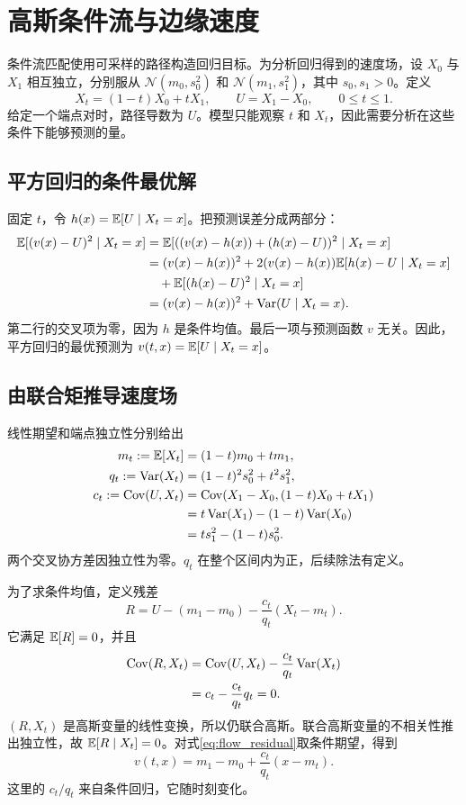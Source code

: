 \section{高斯条件流与边缘速度}\label{sec:flow}
条件流匹配使用可采样的路径构造回归目标。为分析回归得到的速度场，设 $X_0$ 与 $X_1$ 相互独立，分别服从 $\mathcal N(m_0,s_0^2)$ 和 $\mathcal N(m_1,s_1^2)$，其中 $s_0,s_1>0$。定义
\begin{equation}\label{eq:flow_path}
 X_t=(1-t)X_0+tX_1,\qquad U=X_1-X_0,\qquad 0\leq t\leq1.
\end{equation}
给定一个端点对时，路径导数为 $U$。模型只能观察 $t$ 和 $X_t$，因此需要分析在这些条件下能够预测的量。

\subsection{平方回归的条件最优解}
固定 $t$，令 $h(x)=\mathbb E[U\mid X_t=x]$。把预测误差分成两部分：
\begin{align}\label{eq:flow_projection}
 \mathbb E[(v(x)-U)^2\mid X_t=x]
 &=\mathbb E[((v(x)-h(x))+(h(x)-U))^2\mid X_t=x]\notag\\
 &=(v(x)-h(x))^2
   +2(v(x)-h(x))\mathbb E[h(x)-U\mid X_t=x]\notag\\
 &\quad+\mathbb E[(h(x)-U)^2\mid X_t=x]\notag\\
 &=(v(x)-h(x))^2+\operatorname{Var}(U\mid X_t=x).
\end{align}
第二行的交叉项为零，因为 $h$ 是条件均值。最后一项与预测函数 $v$ 无关。因此，平方回归的最优预测为 $v(t,x)=\mathbb E[U\mid X_t=x]$。

\subsection{由联合矩推导速度场}
线性期望和端点独立性分别给出
\begin{align}\label{eq:flow_moments}
 m_t:=\mathbb E[X_t]&=(1-t)m_0+tm_1,\notag\\
 q_t:=\operatorname{Var}(X_t)&=(1-t)^2s_0^2+t^2s_1^2,\notag\\
 c_t:=\operatorname{Cov}(U,X_t)
 &=\operatorname{Cov}(X_1-X_0,(1-t)X_0+tX_1)\notag\\
 &=t\operatorname{Var}(X_1)-(1-t)\operatorname{Var}(X_0)\notag\\
 &=ts_1^2-(1-t)s_0^2.
\end{align}
两个交叉协方差因独立性为零。$q_t$ 在整个区间内为正，后续除法有定义。

为了求条件均值，定义残差
\begin{equation}\label{eq:flow_residual}
 R=U-(m_1-m_0)-\frac{c_t}{q_t}(X_t-m_t).
\end{equation}
它满足 $\mathbb E[R]=0$，并且
\begin{align}\label{eq:flow_residual_cov}
 \operatorname{Cov}(R,X_t)
 &=\operatorname{Cov}(U,X_t)-\frac{c_t}{q_t}\operatorname{Var}(X_t)\notag\\
 &=c_t-\frac{c_t}{q_t}q_t=0.
\end{align}
$(R,X_t)$ 是高斯变量的线性变换，所以仍联合高斯。联合高斯变量的不相关性推出独立性，故 $\mathbb E[R\mid X_t]=0$。对式\eqref{eq:flow_residual}取条件期望，得到
\begin{equation}\label{eq:flow_velocity}
 v(t,x)=m_1-m_0+\frac{c_t}{q_t}(x-m_t).
\end{equation}
这里的 $c_t/q_t$ 来自条件回归，它随时刻变化。


